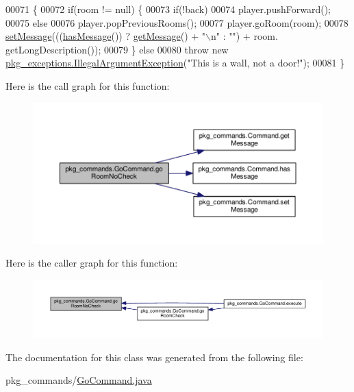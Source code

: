 \begin{DoxyCode}
00071                                                                                                            
                   \{
00072         \textcolor{keywordflow}{if}(room != null) \{
00073             \textcolor{keywordflow}{if}(!back)
00074                 player.pushForward();
00075             \textcolor{keywordflow}{else}
00076                 player.popPreviousRooms();
00077             player.goRoom(room);
00078             \hyperlink{classpkg__commands_1_1Command_ae210ff216fe908b111ba1c988a963d13}{setMessage}(((\hyperlink{classpkg__commands_1_1Command_ae46bb048d0fa705a5037a5204b530da2}{hasMessage}()) ? \hyperlink{classpkg__commands_1_1Command_ac2a42e2bab264821892daefaf9a18b6c}{getMessage}() + \textcolor{stringliteral}{"\(\backslash\)n"} : \textcolor{stringliteral}{""}) + room.
      getLongDescription());
00079         \} \textcolor{keywordflow}{else}
00080             \textcolor{keywordflow}{throw} \textcolor{keyword}{new} \hyperlink{classpkg__exceptions_1_1IllegalArgumentException}{pkg\_exceptions.IllegalArgumentException}(\textcolor{stringliteral}{"This
       is a wall, not a door!"});
00081     \}
\end{DoxyCode}


Here is the call graph for this function\-:
\nopagebreak
\begin{figure}[H]
\begin{center}
\leavevmode
\includegraphics[width=350pt]{classpkg__commands_1_1GoCommand_a210afbc5f3ef34d3ad5759d853c8f8c2_cgraph}
\end{center}
\end{figure}




Here is the caller graph for this function\-:
\nopagebreak
\begin{figure}[H]
\begin{center}
\leavevmode
\includegraphics[width=350pt]{classpkg__commands_1_1GoCommand_a210afbc5f3ef34d3ad5759d853c8f8c2_icgraph}
\end{center}
\end{figure}




The documentation for this class was generated from the following file\-:\begin{DoxyCompactItemize}
\item 
pkg\-\_\-commands/\hyperlink{GoCommand_8java}{Go\-Command.\-java}\end{DoxyCompactItemize}
